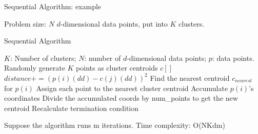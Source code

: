 \documentclass[
nopagebreaks,
style=klope,
fleqn]{powerdot}
\begin{document}
\begin{slide} {Sequential Algorithm: example}
\begin{figure}[h]
  \end{figure}
  \begin{compactitem}
  \item{Problem size: $N$ $d$-dimensional data points, put into $K$ clusters.}
  \end{compactitem}
\end{slide}

\begin{slide} {Sequential Algorithm}
  \footnotesize
  \begin{algorithmic}[1]
    \INPUT $K$: Number of clusters; $N$: number of $d$-dimensional data points; $p$: data points. 
    \State Randomly generate $K$ points as cluster centroids $c[]$
    \State $distance += (p(i)(dd) - c(j)(dd))^2$
    \EndFor
    \EndFor
    \State Find the nearest centroid $c_{nearest}$ for $p(i)$
    \State Assign each point to the nearest cluster centroid
    \State Accumulate $p(i)$'s coordinates
    \State Divide the accumulated coords by num\_points to get the new centroid
    \EndFor
    \State Recalculate termination condition
    \EndWhile
    \EndFunction
  \end{algorithmic}
  \begin{compactitem}
    \vspace{.1in}
  \item{Suppose the algorithm runs m iterations. Time complexity: O(NKdm)}
  \end{compactitem}
\end{slide}
\end{document}
